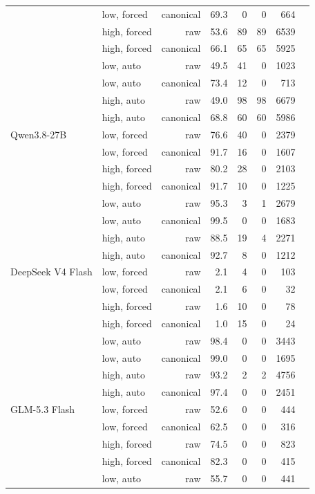 \begin{table}[htbp]
\begin{tabular}{llrrrrrr}
 & low, forced & canonical & 69.3 & 0 & 0 & 664 &  \\
 & high, forced & raw & 53.6 & 89 & 89 & 6539 &  \\
 & high, forced & canonical & 66.1 & 65 & 65 & 5925 &  \\
 & low, auto & raw & 49.5 & 41 & 0 & 1023 &  \\
 & low, auto & canonical & 73.4 & 12 & 0 & 713 &  \\
 & high, auto & raw & 49.0 & 98 & 98 & 6679 &  \\
 & high, auto & canonical & 68.8 & 60 & 60 & 5986 &  \\
\midrule
Qwen3.8-27B & low, forced & raw & 76.6 & 40 & 0 & 2379 &  \\
 & low, forced & canonical & 91.7 & 16 & 0 & 1607 &  \\
 & high, forced & raw & 80.2 & 28 & 0 & 2103 &  \\
 & high, forced & canonical & 91.7 & 10 & 0 & 1225 &  \\
 & low, auto & raw & 95.3 & 3 & 1 & 2679 &  \\
 & low, auto & canonical & 99.5 & 0 & 0 & 1683 &  \\
 & high, auto & raw & 88.5 & 19 & 4 & 2271 &  \\
 & high, auto & canonical & 92.7 & 8 & 0 & 1212 &  \\
\midrule
DeepSeek V4 Flash & low, forced & raw & 2.1 & 4 & 0 & 103 &  \\
 & low, forced & canonical & 2.1 & 6 & 0 & 32 &  \\
 & high, forced & raw & 1.6 & 10 & 0 & 78 &  \\
 & high, forced & canonical & 1.0 & 15 & 0 & 24 &  \\
 & low, auto & raw & 98.4 & 0 & 0 & 3443 &  \\
 & low, auto & canonical & 99.0 & 0 & 0 & 1695 &  \\
 & high, auto & raw & 93.2 & 2 & 2 & 4756 &  \\
 & high, auto & canonical & 97.4 & 0 & 0 & 2451 &  \\
\midrule
GLM-5.3 Flash & low, forced & raw & 52.6 & 0 & 0 & 444 &  \\
 & low, forced & canonical & 62.5 & 0 & 0 & 316 &  \\
 & high, forced & raw & 74.5 & 0 & 0 & 823 &  \\
 & high, forced & canonical & 82.3 & 0 & 0 & 415 &  \\
 & low, auto & raw & 55.7 & 0 & 0 & 441 &  \\

\end{tabular}
\end{table}
